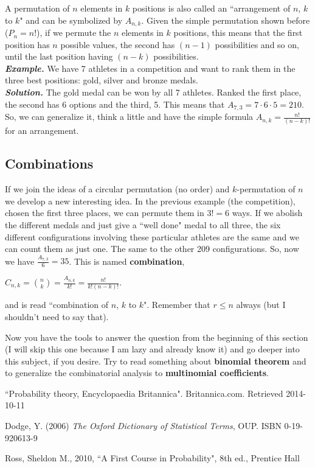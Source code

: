 \documentclass[a4paper,twocolumn]{article}
\begin{document}
A permutation of $n$ elements in $k$ positions is also called an ``arrangement of $n$, $k$ to $k$" and can be symbolized by $A_{n,k}$. Given the simple permutation shown before ($P_n = n!$), if we permute the $n$ elements in $k$ positions, this means that the first position has $n$ possible values, the second has $(n -1)$ possibilities and so on, until the last position having $(n - k)$ possibilities.\\

\noindent\textbf{\textit{Example.}} We have 7 athletes in a competition and want to rank them in the three best positions: gold, silver and bronze medals.\\
\noindent\textbf{\textit{Solution.}} The gold medal can be won by all 7 athletes. Ranked the first place, the second has 6 options and the third, 5. This means that $A_{7,3} = 7 \cdot 6 \cdot 5 = 210$.\\

\noindent So, we can generalize it, think a little and have the simple formula $A_{n,k} = \frac{n!}{(n - k)!}$ for an arrangement.


\subsection{Combinations}

If we join the ideas of a circular permutation (no order) and $k$-permutation of $n$ we develop a new interesting idea. In the previous example (the competition), chosen the first three places, we can permute them in $3! = 6$ ways. If we abolish the different medals and just give a ``well done" medal to all three, the six different configurations involving these particular athletes are the same and we can count them as just one. The same to the other 209 configurations. So, now we have $\frac{A_{7,3}}{6} = 35$. This is named \textbf{combination},

\begin{center}
$C_{n,k} = \binom{n}{k} = \frac{A_{n,k}}{k!} = \frac{n!}{k!(n - k)!}$.
\end{center}

\noindent and is read ``combination of $n$, $k$ to $k$". Remember that $r \leq n$ always (but I shouldn't need to say that).

Now you have the tools to answer the question from the beginning of this section (I will skip this one because I am lazy and already know it) and go deeper into this subject, if you desire. Try to read something about \textbf{binomial theorem} and to generalize the combinatorial analysis to \textbf{multinomial coefficients}.


\begin{thebibliography}{9}
         ``Probability theory, Encyclopaedia Britannica".
         Britannica.com.
         Retrieved 2014-10-11

        Dodge, Y. (2006)
        \textit{The Oxford Dictionary of Statistical Terms}, OUP.
        ISBN 0-19-920613-9

        Ross, Sheldon M.,
        2010,
        ``A First Course in Probability", 8th ed.,
        Prentice Hall
\end{thebibliography}
\end{document}
